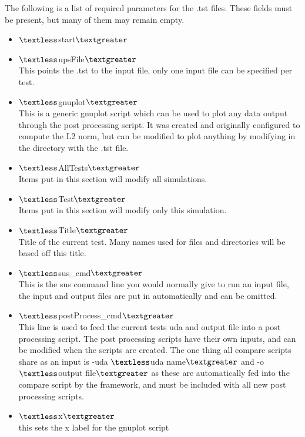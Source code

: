 The following is a list of required parameters for the .tst files. These fields must be present, but many of them may remain empty.
\begin{itemize}
\item $\textless$start$\textgreater$
\item $\textless$upsFile$\textgreater$ \\
This points the .tst to the input file, only one input file can be specified per test.
\item $\textless$gnuplot$\textgreater$ \\
This is a generic gnuplot script which can be used to plot any data output through the post processing script. It was created and originally configured to compute the L2 norm, but can be modified to plot anything by modifying  in the directory with the .tst file.
\item $\textless$AllTests$\textgreater$ \\
Items put in this section will modify all simulations.
\item $\textless$Test$\textgreater$ \\
Items put in this section will modify only this simulation.
\item $\textless$Title$\textgreater$ \\
Title of the current test. Many names used for files and directories will be based off this title.
\item $\textless$sus\_cmd$\textgreater$ \\
This is the sus command line you would normally give to run an input file, the input and output files are put in automatically and can be omitted.
\item $\textless$postProcess\_cmd$\textgreater$ \\
This line is used to feed the current tests uda and output file into a post processing script. The post processing scripts have their own inputs, and can be modified when the scripts are created. The one thing all compare scripts share as an input is -uda $\textless$uda name$\textgreater$ and -o $\textless$output file$\textgreater$ as these are automatically fed into the compare script by the framework, and must be included with all new post processing scripts.
\item $\textless$x$\textgreater$\\
this sets the x label for the gnuplot script
\end{itemize}

